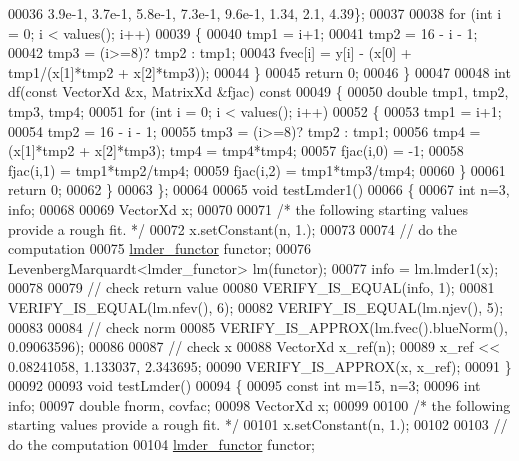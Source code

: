 \begin{DoxyCode}
00036             3.9e-1, 3.7e-1, 5.8e-1, 7.3e-1, 9.6e-1, 1.34, 2.1, 4.39\};
00037 
00038         \textcolor{keywordflow}{for} (\textcolor{keywordtype}{int} i = 0; i < values(); i++)
00039         \{
00040             tmp1 = i+1;
00041             tmp2 = 16 - i - 1;
00042             tmp3 = (i>=8)? tmp2 : tmp1;
00043             fvec[i] = y[i] - (x[0] + tmp1/(x[1]*tmp2 + x[2]*tmp3));
00044         \}
00045         \textcolor{keywordflow}{return} 0;
00046     \}
00047 
00048     \textcolor{keywordtype}{int} df(\textcolor{keyword}{const} VectorXd &x, MatrixXd &fjac)\textcolor{keyword}{ const}
00049 \textcolor{keyword}{    }\{
00050         \textcolor{keywordtype}{double} tmp1, tmp2, tmp3, tmp4;
00051         \textcolor{keywordflow}{for} (\textcolor{keywordtype}{int} i = 0; i < values(); i++)
00052         \{
00053             tmp1 = i+1;
00054             tmp2 = 16 - i - 1;
00055             tmp3 = (i>=8)? tmp2 : tmp1;
00056             tmp4 = (x[1]*tmp2 + x[2]*tmp3); tmp4 = tmp4*tmp4;
00057             fjac(i,0) = -1;
00058             fjac(i,1) = tmp1*tmp2/tmp4;
00059             fjac(i,2) = tmp1*tmp3/tmp4;
00060         \}
00061         \textcolor{keywordflow}{return} 0;
00062     \}
00063 \};
00064 
00065 \textcolor{keywordtype}{void} testLmder1()
00066 \{
00067   \textcolor{keywordtype}{int} n=3, info;
00068 
00069   VectorXd x;
00070 
00071   \textcolor{comment}{/* the following starting values provide a rough fit. */}
00072   x.setConstant(n, 1.);
00073 
00074   \textcolor{comment}{// do the computation}
00075   \hyperlink{structlmder__functor}{lmder\_functor} functor;
00076   LevenbergMarquardt<lmder\_functor> lm(functor);
00077   info = lm.lmder1(x);
00078 
00079   \textcolor{comment}{// check return value}
00080   VERIFY\_IS\_EQUAL(info, 1);
00081   VERIFY\_IS\_EQUAL(lm.nfev(), 6);
00082   VERIFY\_IS\_EQUAL(lm.njev(), 5);
00083 
00084   \textcolor{comment}{// check norm}
00085   VERIFY\_IS\_APPROX(lm.fvec().blueNorm(), 0.09063596);
00086 
00087   \textcolor{comment}{// check x}
00088   VectorXd x\_ref(n);
00089   x\_ref << 0.08241058, 1.133037, 2.343695;
00090   VERIFY\_IS\_APPROX(x, x\_ref);
00091 \}
00092 
00093 \textcolor{keywordtype}{void} testLmder()
00094 \{
00095   \textcolor{keyword}{const} \textcolor{keywordtype}{int} m=15, n=3;
00096   \textcolor{keywordtype}{int} info;
00097   \textcolor{keywordtype}{double} fnorm, covfac;
00098   VectorXd x;
00099 
00100   \textcolor{comment}{/* the following starting values provide a rough fit. */}
00101   x.setConstant(n, 1.);
00102 
00103   \textcolor{comment}{// do the computation}
00104   \hyperlink{structlmder__functor}{lmder\_functor} functor;

\end{DoxyCode}
